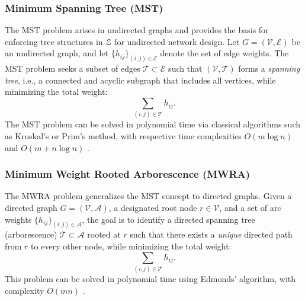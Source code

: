 \documentclass[11pt,a4paper]{article}
\theoremstyle{plain}
\theoremstyle{definition}
\theoremstyle{remark}
\begin{document}
	\subsubsection{Minimum Spanning Tree (MST)}
	\label{Subsec:MST}
	
	The MST problem arises in undirected graphs and provides the basis for enforcing tree structures in $\mathcal{Z}$ for undirected network design.  
	Let $G = (\mathcal{V}, \mathcal{E})$ be an undirected graph, and let $\{h_{ij}\}_{(i,j) \in \mathcal{E}}$ denote the set of edge weights.  
	The MST problem seeks a subset of edges $\mathcal{T} \subset \mathcal{E}$ such that $(\mathcal{V}, \mathcal{T})$ forms a \emph{spanning tree}, i.e., a connected and acyclic subgraph that includes all vertices, while minimizing the total weight:
	\begin{equation}
		\sum_{(i,j) \in \mathcal{T}} h_{ij}.
		\label{WEIGHTS_MST}
	\end{equation}
	The MST problem can be solved in polynomial time via classical algorithms such as Kruskal's or Prim's method, with respective time complexities $O(m \log n)$ and $O(m + n \log n)$ \cite[Chapter~6.3]{korte2018combinatorial}.
	
	\subsubsection{Minimum Weight Rooted Arborescence (MWRA)}
	\label{Subsec:MWRA}
	
	The MWRA problem generalizes the MST concept to directed graphs.  
	Given a directed graph $G = (\mathcal{V}, \mathcal{A})$, a designated root node $r \in \mathcal{V}$, and a set of arc weights $\{h_{ij}\}_{(i,j) \in \mathcal{A}}$, the goal is to identify a directed spanning tree (arborescence) $\mathcal{T} \subset \mathcal{A}$ rooted at $r$ such that there exists a \emph{unique} directed path from $r$ to every other node, while minimizing the total weight:
	\begin{equation}
		\sum_{(i,j) \in \mathcal{T}} h_{ij}.
		\label{WEIGHTS_MWRA}
	\end{equation}
	This problem can be solved in polynomial time using Edmonds' algorithm, with complexity $O(mn)$ \cite[Chapter~6.3]{korte2018combinatorial}.  
	
	
	
\end{document}
